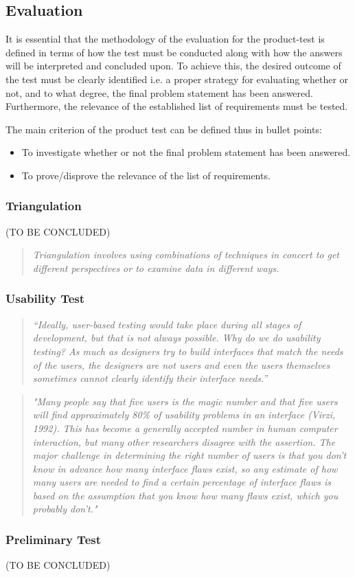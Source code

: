 \subsection{Evaluation}
It is essential that the methodology of the evaluation for the product-test is defined in terms of how the test must be conducted along with how the answers will be interpreted and concluded upon. To achieve this, the desired outcome of the test must be clearly identified i.e. a proper strategy for evaluating whether or not, and to what degree, the final problem statement has been answered. Furthermore, the relevance of the established list of requirements must be tested.

The main criterion of the product test can be defined thus in bullet points:
\begin{itemize}
\item To investigate whether or not the final problem statement has been answered.
\item To prove/disprove the relevance of the list of requirements.
\end{itemize}

\subsubsection{Triangulation}
(TO BE CONCLUDED)
\begin{quote}
\textit{Triangulation involves using combinations of techniques in concert to get different perspectives or to examine data in different ways.} \parencite{Rogers2002}
\end{quote}

\subsubsection{Usability Test}
\begin{quote}
\textit{“Ideally, user-based testing would take place during all stages of development, but that is not always possible. Why do we do usability testing? As much as designers try to build interfaces that match the needs of the users, the designers are not users and even the users themselves sometimes cannot clearly identify their interface needs.”}
\parencite{Lazar2010}
\end{quote}
\begin{quote}
\textit{"Many people say that five users is the magic number and that five users will find approximately 80\% of usability problems in an interface (Virzi, 1992). This has become a generally accepted number in human computer interaction, but many other researchers disagree with the assertion. The major challenge in determining the right number of users is that you don’t know in advance how many interface flaws exist, so any estimate of how many users are needed to find a certain percentage of interface flaws is based on the assumption that you know how many flaws exist, which you probably don’t."}
\parencite{Lazar2010}
\end{quote}

\subsubsection{Preliminary Test}
(TO BE CONCLUDED)
